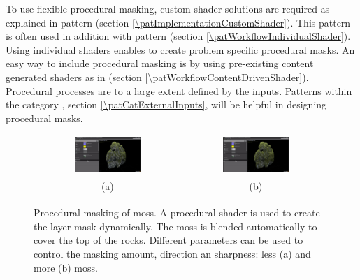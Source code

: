 \begin{description}
	To use flexible procedural masking, custom shader solutions are required as explained in pattern \emph{\patImplementationCustomShader} (section \ref{\patImplementationCustomShader}). This pattern is often used in addition with pattern \emph{\patWorkflowIndividualShader} (section \ref{\patWorkflowIndividualShader}). Using individual shaders enables to create problem specific procedural masks. An easy way to include procedural masking is by using pre-existing content generated shaders as in  \emph{\patWorkflowContentDrivenShader} (section \ref{\patWorkflowContentDrivenShader}). Procedural processes are to a large extent defined by the inputs. Patterns within the category \emph{\patCatExternalInputs}, section \ref{\patCatExternalInputs}, will be helpful in designing procedural masks. 
\end{description}


\begin{figure}
	\centering\small 
	\begin{tabular}{@{}cc@{}}
		\includegraphics[width=0.475\textwidth]{images/07cha_20_mossShader(1).jpg} &
		\includegraphics[width=0.475\textwidth]{images/07cha_20_mossShader(2).jpg} \\	
		(a) & (b) \\ 
	\end{tabular}
	\caption{Procedural masking of moss. A procedural shader is used to create the layer mask dynamically. The moss is blended automatically to cover the top of the rocks. Different parameters can be used to control the masking amount, direction an sharpness: less (a) and more (b) moss.
	}
	\label{fig:procedural mask}
\end{figure}




